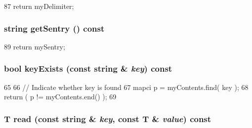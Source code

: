 \begin{DoxyCode}
87 { return myDelimiter; }
\end{DoxyCode}
\hypertarget{classConfigFile_ab17a5e6d4c88fa106b1710af1cd3a2c2}{
\subsubsection[{getSentry}]{\setlength{\rightskip}{0pt plus 5cm}string getSentry () const}}
\label{classConfigFile_ab17a5e6d4c88fa106b1710af1cd3a2c2}



\begin{DoxyCode}
89 { return mySentry; }
\end{DoxyCode}
\hypertarget{classConfigFile_a375a61510313ca09287a55d05e1db4a9}{
\subsubsection[{keyExists}]{\setlength{\rightskip}{0pt plus 5cm}bool keyExists (const string \& {\em key}) const}}
\label{classConfigFile_a375a61510313ca09287a55d05e1db4a9}



\begin{DoxyCode}
65 {
66     // Indicate whether key is found
67     mapci p = myContents.find( key );
68     return ( p != myContents.end() );
69 }
\end{DoxyCode}
\hypertarget{classConfigFile_a1cb8eb61d921281aec93e521322ccb21}{
\subsubsection[{read}]{\setlength{\rightskip}{0pt plus 5cm}T read (const string \& {\em key}, \/  const T \& {\em value}) const}}
\label{classConfigFile_a1cb8eb61d921281aec93e521322ccb21}



